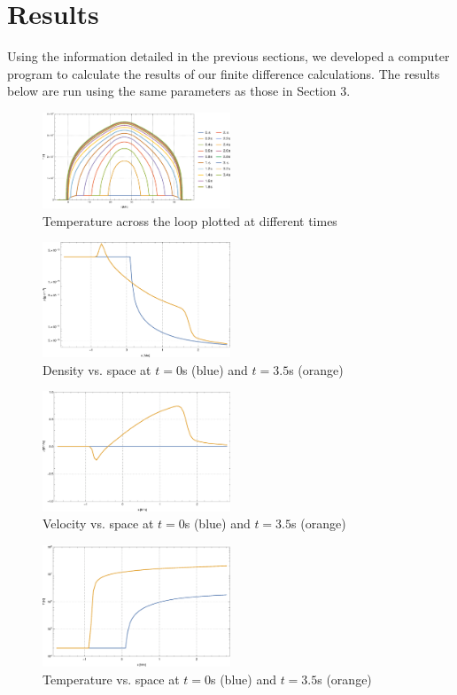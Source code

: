 \documentclass[iop]{emulateapj}
\begin{document}
	\section{Results}
	
		Using the information detailed in the previous sections, we developed a computer program to calculate the results of our finite difference calculations. The results below are run using the same parameters as those in \cite{2014ApJ...795...10L} Section 3.
	
		\begin{figure}[H]
			\centering
			\includegraphics[width=0.5\textwidth]{figures/temp_vs_time}
			\caption{Temperature across the loop plotted at different times}
		\end{figure}
		\begin{figure}[H]
			\centering
			\includegraphics[width=0.5\textwidth]{figures/rho_vs_s}
			\caption{Density vs. space at $t=0$s (blue) and $t=3.5$s (orange)}
		\end{figure}
		\begin{figure}[H]
			\centering
			\includegraphics[width=0.5\textwidth]{figures/vel_vs_s}
			\caption{Velocity vs. space at $t=0$s (blue) and $t=3.5$s (orange)}
		\end{figure}
		\begin{figure}[H]
			\centering
			\includegraphics[width=0.5\textwidth]{figures/T_vs_s}
			\caption{Temperature vs. space at $t=0$s (blue) and $t=3.5$s (orange)}
		\end{figure}
		
\end{document}
